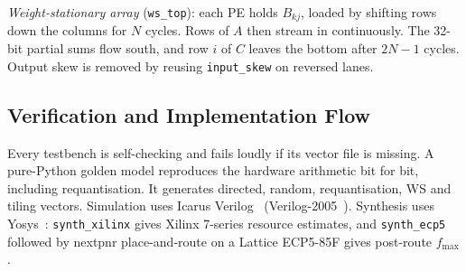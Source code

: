 \emph{Weight-stationary array} (\texttt{ws\_top}): each PE holds $B_{kj}$,
loaded by shifting rows down the columns for $N$ cycles. Rows of $A$ then
stream in continuously. The 32-bit partial sums flow south, and row $i$ of
$C$ leaves the bottom after $2N-1$ cycles. Output skew is removed by
reusing \texttt{input\_skew} on reversed lanes.

\subsection{Verification and Implementation Flow}
Every testbench is self-checking and fails loudly if its vector file is
missing. A pure-Python golden model reproduces the hardware arithmetic
bit for bit, including requantisation. It generates directed, random,
requantisation, WS and tiling vectors. Simulation uses Icarus
Verilog~\cite{icarus} (Verilog-2005~\cite{ieee1364}). Synthesis uses
Yosys~\cite{wolf_yosys}: \texttt{synth\_xilinx} gives Xilinx 7-series resource
estimates, and \texttt{synth\_ecp5} followed by nextpnr place-and-route on a
Lattice ECP5-85F gives post-route $f_{\max}$.
